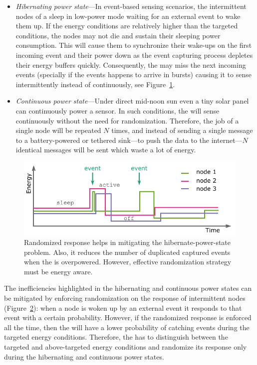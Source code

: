 \begin{itemize}
\begin{figure}
		\label{fig:noRand}
\end{figure} 
%
		\item \label{it:hibernating} \textit{Hibernating power state}---In event-based sensing scenarios, the intermittent nodes of a \sys sleep in low-power mode waiting for an external event to wake them up. If the energy conditions are relatively higher than the targeted conditions, the nodes may not die and sustain their sleeping power consumption. This will cause them to synchronize their wake-ups on the first incoming event and their power down as the event capturing process depletes their energy buffers quickly. Consequently, the \sys may miss the next incoming events (specially if the events happens to arrive in bursts) causing it to sense intermittently instead of continuously, see Figure~\ref{fig:noRand}. 
		\item \label{it:continuous} \textit{Continuous power state}---Under direct mid-noon sun even a tiny solar panel can continuously power a sensor. In such conditions, the \sys will sense continuously without the need for randomization. Therefore, the job of a single node will be repeated $N$ times, and instead of sending a single message to a battery-powered or tethered sink---to push the data to the internet---$N$ identical messages will be sent which waste a lot of energy. 
				
\end{itemize}
%
\begin{figure}
		\centering
		\includegraphics[width=\columnwidth]{figures/randomized_response}
		\caption{Randomized response helps in mitigating the hibernate-power-state problem. Also, it reduces the number of duplicated captured events when the \sys is overpowered. However, effective randomization strategy must be energy aware.}
		\label{fig:rand}
\end{figure} 

The inefficiencies highlighted in the hibernating and continuous power states can be mitigated by enforcing randomization on the response of intermittent nodes (Figure~\ref{fig:rand}): when a node is woken up by an external event it responds to that event with a certain probability. However, if the randomized response is enforced all the time, then the \sys will have a lower probability of catching events during the targeted energy conditions. Therefore, the \sys has to distinguish between the targeted and above-targeted energy conditions and randomize its response only during the hibernating and continuous power states. 


